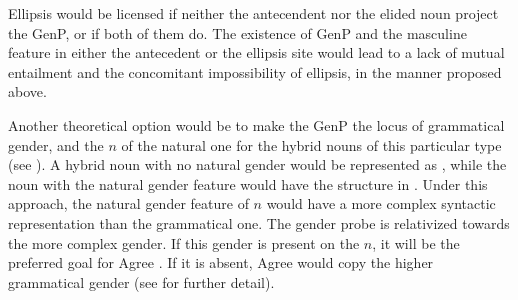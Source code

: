 \documentclass[output=paper,
modfonts,
newtxmath,
hidelinks
]{langscibook}
\begin{document}
\noindent Ellipsis would be licensed if neither the antecendent nor the elided noun project the GenP, or if both of them do. The existence of GenP and the masculine feature in either the antecedent or the ellipsis site would lead to a lack of mutual entailment and the concomitant impossibility of ellipsis, in the manner proposed above.
			
			Another theoretical option would be to make the GenP the locus of grammatical gender, and the $n$ of the natural one for the hybrid nouns of this particular type (see \citealt{puskar17,puskarhybrid17}). A hybrid noun with no natural gender would be represented as , while the noun with the natural gender feature would have the structure in . Under this approach, the natural gender feature of $n$ would have a more complex syntactic representation than the grammatical one. The gender probe is relativized towards the more complex gender. If this gender is present on the $n$, it will be the preferred goal for Agree . If it is absent, Agree would copy the higher grammatical gender  (see \citealt{puskar17} for further detail).  
			
\end{document}
